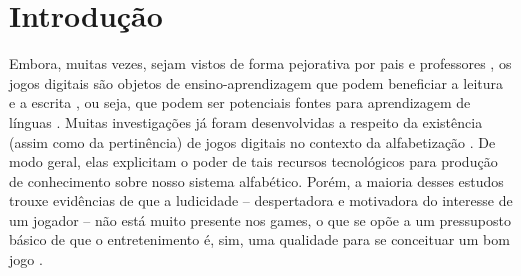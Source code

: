 \documentclass{textolivre}
\begin{document}
\begin{polyabstract}
\begin{english}
\begin{abstract}
\end{abstract}
\end{english}

\end{polyabstract}


\section{Introdução}\label{sec-intro}
Embora, muitas vezes, sejam vistos de forma pejorativa por pais e professores \cite{leffa2012}, os jogos digitais são objetos de ensino-aprendizagem que podem beneficiar a leitura e a escrita \cite{ribeiro2016}, ou seja, que podem ser potenciais fontes para aprendizagem de línguas \cite{leffa2012}. Muitas investigações já foram desenvolvidas a respeito da existência (assim como da pertinência) de jogos digitais no contexto da alfabetização \cite{coscarelli2013, ribeiro2012, ribeiro2013, ribeiro2009}. De modo geral, elas explicitam o poder de tais recursos tecnológicos para produção de conhecimento sobre nosso sistema alfabético. Porém, a maioria desses estudos trouxe evidências de que a ludicidade – despertadora e motivadora do interesse de um jogador – não está muito presente nos games, o que se opõe a um pressuposto básico de que o entretenimento é, sim, uma qualidade para se conceituar um bom jogo \cite{leffa2012}.
\end{document}
